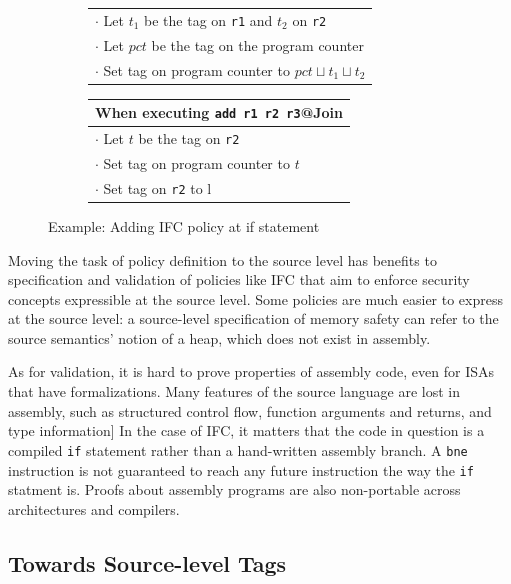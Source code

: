 \documentclass{report}
\begin{document}
\begin{figure}
\begin{subfigure}{\textwidth}
\begin{tabular}{|l|}
      \(\cdot\) Let \(t_1\) be the tag on {\tt r1} and \(t_2\) on {\tt r2} \\
       \rowcolor{blue!30}
      \(\cdot\) Let \(pct\) be the tag on the program counter \\
      \rowcolor{blue!30}
      \(\cdot\) Set tag on program counter to \(pct \sqcup t_1 \sqcup t_2\) \\
      \hline
    \end{tabular}
    \begin{tabular}{|l|}
      \hline
      When executing {\tt add r1 r2 r3}@{\sc Join} \\
      \hline
      \rowcolor{blue!30}
      \(\cdot\) Let \(t\) be the tag on {\tt r2} \\
      \rowcolor{blue!30}
      \(\cdot\) Set tag on program counter to \(t\) \\
      \rowcolor{red!20}
      \(\cdot\) Set tag on {\tt r2} to {\sc l} \\
      \hline
    \end{tabular}
 \end{subfigure}

  \caption{Example: Adding IFC policy at if statement}
  \label{ex:if}
\end{figure}

Moving the task of policy definition to the source level has benefits to specification and
validation of policies like IFC that aim to enforce security concepts expressible at the
source level. Some policies are much easier to express at the source level: a source-level
specification of memory safety can refer to the source semantics' notion of a heap, which
does not exist in assembly.

As for validation, it is hard to prove properties of assembly code, even for ISAs that
have formalizations. Many features of the source language are lost in assembly, such as 
structured control flow, function arguments and returns, and type information] 
In the case of IFC, it matters that the code in question is a compiled {\tt if} statement
rather than a hand-written assembly branch. A {\tt bne} instruction is not guaranteed to
reach any future instruction the way the {\tt if} statment is.
Proofs about assembly programs are also non-portable across architectures and compilers.

\subsection{Towards Source-level Tags}
\end{document}
